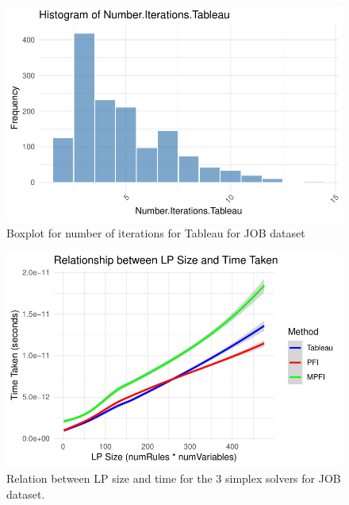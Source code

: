 \begin{figure}[!htb]
    \centering
    \includegraphics[width=\textwidth]{figures/histogram_iter_tableau.pdf}
    \caption{Boxplot for number of iterations for Tableau for JOB dataset}
    \label{fig:num_iter_boxplot_tableau_job}
\end{figure}


\begin{figure}[!htb]
    \centering
    \includegraphics[width=\textwidth]{figures/lp_size_vs_time_job.pdf}
    \caption{Relation between LP size and time for the 3 simplex solvers for JOB dataset.}
    \label{fig:lp_size_vs_time_job}
\end{figure}

